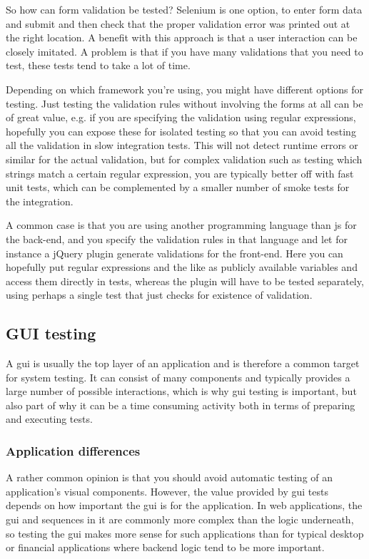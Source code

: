 \documentclass[11pt]{article}
\begin{document}
So how can form validation be tested? Selenium is one option, to enter form data and submit and then check that the proper validation error was printed out at the right location. A benefit with this approach is that a user interaction can be closely imitated. A problem is that if you have many validations that you need to test, these tests tend to take a lot of time.

Depending on which framework you're using, you might have different options for testing. Just testing the validation rules without involving the forms at all can be of great value, e.g. if you are specifying the validation using regular expressions, hopefully you can expose these for isolated testing so that you can avoid testing all the validation in slow integration tests. This will not detect runtime errors or similar for the actual validation, but for complex validation such as testing which strings match a certain regular expression, you are typically better off with fast unit tests, which can be complemented by a smaller number of smoke tests for the integration.

A common case is that you are using another programming language than \gls{js} for the back-end, and you specify the validation rules in that language and let for instance a jQuery plugin generate validations for the front-end. Here you can hopefully put regular expressions and the like as publicly available variables and access them directly in tests, whereas the plugin will have to be tested separately, using perhaps a single test that just checks for existence of validation.

\subsection{GUI testing}

A \acrfull{gui} is usually the top layer of an application and is therefore a common target for system testing. It can consist of many components and typically provides a large number of possible interactions, which is why \gls{gui} testing is important, but also part of why it can be a time consuming activity both in terms of preparing and executing tests.

\subsubsection{Application differences}

A rather common opinion is that you should avoid automatic testing of an application's visual components. However, the value provided by \gls{gui} tests depends on how important the \gls{gui} is for the application. In web applications, the \gls{gui} and sequences in it are commonly more complex than the logic underneath, so testing the \gls{gui} makes more sense for such applications than for typical desktop or financial applications where backend logic tend to be more important. \cite[question~21]{Ahnve}
\end{document}

